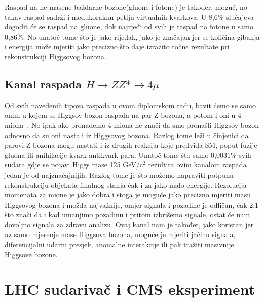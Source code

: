 \documentclass[12pt,a4paper,oneside]{article}
\begin{document}
\begin{linenumbers}
		Raspad na ne masene baždarne bozone(gluone i fotone) je također, moguć, no takav raspad sadrži i međukoraknu petlju virtualnih kvarkova. U 8,6\% slučajeva dogodit će se raspad na gluone, dok najrjeđi od svih je raspad na fotone u samo 0,86\%. No unatoč tome što je jako rijedak, jako je značajan jer se količina gibanja i energija može mjeriti jako precizno što daje izrazito točne rezultate pri rekonstrukciji Higgsovog bozona.
		
		
		\subsection{Kanal raspada \begin{math}
			H \rightarrow ZZ* \rightarrow 4\mu \end{math}}
		Od svih navedenih tipova raspada u ovom diplomskom radu, bavit ćemo se samo onim u kojem se Higgsov bozon raspada na par Z bozona, a potom i oni u 4 miona~\cite{doktorat}. No ipak ako pronađemo 4 miona ne znači da smo pronašli Higgsov bozon odnosno da su oni nastali iz Higgsovog bozona. Razlog tome leži u činjenici da parovi Z bozona mogu nastati i iz drugih reakcija koje predviđa SM, poput fuzije gluona ili anihilacije kvark antikvark para.
		Unatoč tome što samo 0,0031\% svih sudara gdje se pojavi Higgs mase 
		125 GeV/c$^2$
	 rezultira ovim kanalom raspada jedan je od najznačajnijih. Razlog tome je što možemo napraviti potpunu rekonstrukciju objekata finalnog stanja čak i za jako malo energije. Rezolucija momenata za mione je jako dobra i stoga je moguće jako precizno mjeriti masu Higgsovog bozona i možda najvažnije, omjer signala i pozadine je odličan, čak 2:1 što znači da i kad umanjimo pozadinu i pritom izbrišemo signale, ostat će nam dovoljno signala za zdravu analizu. Ovaj kanal nam je također, jako koristan jer uz samo mjerenje mase Higgsova bozona, moguće je mjeriti jačinu signala, diferencijalni udarni presjek, anomalne interakcije ili pak tražiti masivnije Higgsove bozone.
		
		
		\newpage
		\section{LHC sudarivač i CMS eksperiment}

\end{linenumbers}
\end{document}

